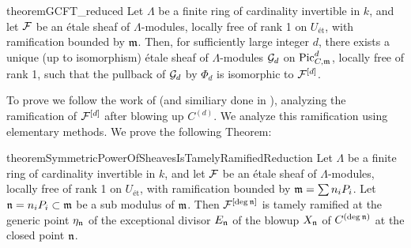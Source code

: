 \begin{restatable}{theorem}{GCFT_reduced}\label{thm:GCFT_reduced}
    Let $\Lambda$ be a finite ring of cardinality invertible in $k$, and let $\cF$ be an \'etale sheaf of $\Lambda$-modules, locally free of rank 1 on $U_{\text{\'et}}$, with ramification bounded by $\mdls$. 
    Then, for sufficiently large integer $d$, there exists a unique (up to isomorphism) \'etale sheaf of $\Lambda$-modules $\cG_d$ on $\PicCm[d]$, locally free of rank 1, such that the pullback of $\cG_d$ by $\Phi_d$ is isomorphic to $\cF^{[d]}$.
\end{restatable}





To prove  we follow the work of \cite{takeuchi2019blow} (and similiary done in \cite{Toth2011}),
analyzing the ramification of $\cF^{[d]}$ after blowing up $C^{(d)}$. We analyze this ramification using elementary methods.
We prove the following Theorem:

\begin{restatable}{theorem}{SymmetricPowerOfSheavesIsTamelyRamifiedReduction}\label{theorem:SymmetricPowerOfSheavesIsTamelyRamifiedReduction}
     Let $\Lambda$ be a finite ring of cardinality invertible in $k$, and let $\cF$ be an \'etale sheaf of $\Lambda$-modules, locally free of rank 1 on $U_{\text{\'et}}$, with ramification bounded by $\mdls = \sum n_i P_i$. 
     Let $\ndls = n_i P_i \subset \mdls$ be a sub modulus of $\mdls$.
     Then $\cF^{[\deg \ndls]}$ is tamely ramified at the generic point $\eta_\ndls$ of the exceptional divisor $E_\ndls$ 
     of the blowup $X_{\ndls}$ of $C^{(\deg \ndls)}$ at the closed point $\ndls$.
\end{restatable}


